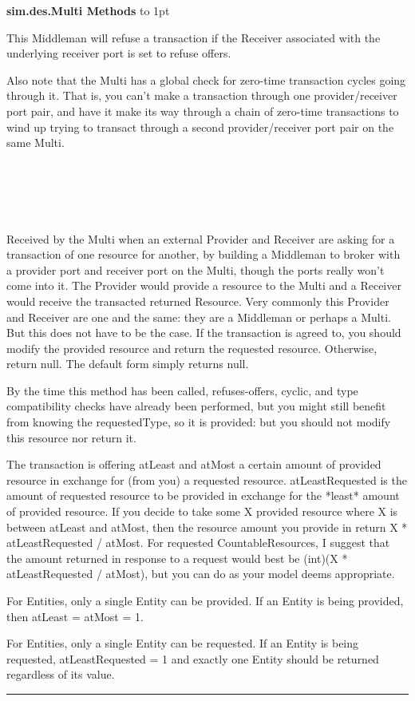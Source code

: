 \documentclass[twoside,10pt]{article}
\newcommand\class[1]{\index{Classes!{#1}}\textsf{#1}}
\newcommand\code[1]{\textsf{#1}}
\newcommand*{\xfill}[1][0pt]{%
	\cleaders
		\hbox to 1pt{\hss
			\raisebox{#1}{\rule{1.2pt}{0.4pt}}%
			\hss}\hfill}
\newenvironment{methods}[1]{
\vspace{1.0em}\noindent\textsf{\textbf{#1 Methods}}\quad \xfill[0.5ex]
\vspace{-0.25em}
\begin{description}
\small}
{\end{description}\hrule\vspace{1.5em}}
\newcommand{\mthd}[1]{\item[{\sf #1}]~\newline}
\begin{document}
\begin{methods}{\class{sim.des.Multi}}
This Middleman will refuse a transaction if the Receiver associated with the underlying receiver port
    	is set to refuse offers. 
    	
Also note that the Multi has a global check for zero-time transaction cycles going 
    	through it.  That is, you can't make a transaction through one provider/receiver port pair, and have it make
    	its way through a chain of zero-time transactions to wind up trying to transact through a second
    	provider/receiver port pair on the same Multi. 
	
\mthd{protected Resource performTransaction(int myProviderPort, int myReceiverPort, Provider provider, Receiver receiver,}
\rule{0pt}{0pt}\hspace{\fill}{\sf Resource provided, double atLeast, double atMost, Resource requestedType,}\\ \rule{0pt}{0pt}\hspace{\fill}{\sf double atLeastRequested)}\\
Received by the Multi when an external Provider and Receiver are asking for a transaction of one resource for another,
    	by building a Middleman to broker with a provider port and receiver port on the Multi, though the ports really won't
    	come into it.  
    	The Provider would provide a resource to the Multi and a Receiver would receive the transacted returned Resource.
    	Very commonly this Provider and Receiver are one and the same: they are a Middleman or perhaps a Multi. 
    	But this does not have to be the case.  	
		If the transaction is agreed to, you should modify the provided resource and return the requested resource.
		Otherwise, return null.  The default form simply returns null. 
		
By the time this method has been called, refuses-offers,
		cyclic, and type compatibility checks have already been performed, but you might still benefit from 
		knowing the requestedType, so it is provided: but you should not modify this resource nor return it.
				
The transaction is offering atLeast and atMost a certain amount of provided resource in exchange for
    	(from you) a requested resource.  atLeastRequested is the amount of requested resource to be provided
    	in exchange for the *least* amount of provided resource.  If you decide to take some X provided resource
    	where X is between atLeast and atMost, then the resource amount you provide in return 
	\code{X * atLeastRequested / atMost}.
    	For requested CountableResources, I suggest that the amount returned in response to a request would best be
    	\code{(int)(X * atLeastRequested / atMost)}, but you can do as your model deems appropriate.
    	
For Entities, only a single Entity can be provided.  If an Entity is being provided, then atLeast = atMost = 1.
    	
For Entities, only a single Entity can be requested.  If an Entity is being requested, atLeastRequested = 1
    	and exactly one Entity should be returned regardless of its value. 
\end{methods}
\end{document}
